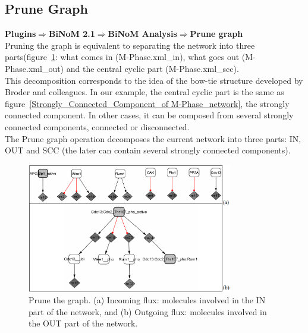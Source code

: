 \subsection{Prune Graph}
\textbf{Plugins$\Rightarrow$BiNoM 2.1$\Rightarrow$BiNoM Analysis$\Rightarrow$Prune graph}\\
Pruning the graph is equivalent to separating the network into three parts(figure~\ref{Prune_the_graph}: what comes in (M-Phase.xml\_in), what goes out (M-Phase.xml\_out) and the central cyclic part (M-Phase.xml\_scc).
\\This decomposition corresponds to the idea of the bow-tie structure developed by Broder and colleagues\cite{broder2000graph}. In our example, the central cyclic part is the same as figure~\ref{Strongly_Connected_Component_of M-Phase_network}, the strongly connected component. In other cases, it can be composed from several strongly connected components, connected or disconnected.\\
The Prune graph operation decomposes the current network into three parts: IN, OUT and SCC (the later can contain several strongly connected components).
\begin{figure}
\centering
\includegraphics[width=0.8\textwidth]{graphics/Prune_the_graph}
\caption{Prune the graph. (a) Incoming flux: molecules involved in the IN part of the network, and (b) Outgoing flux: molecules involved in the OUT part of the network.}
\label{Prune_the_graph}
\end{figure}

